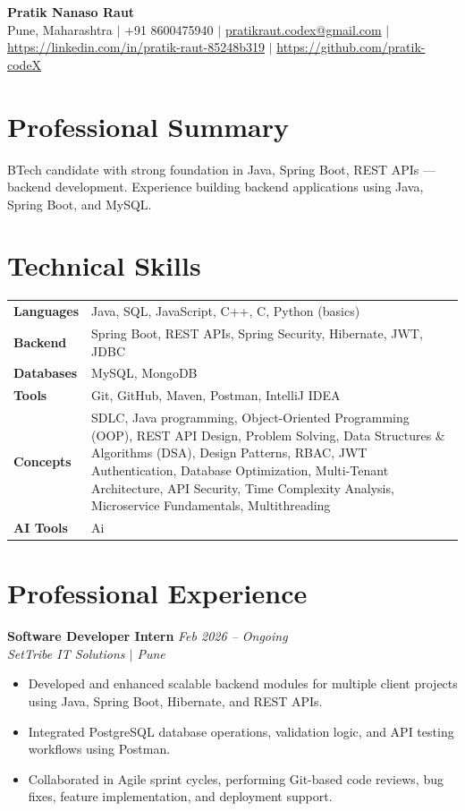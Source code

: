 \documentclass[10.5pt,a4paper]{article}
\begin{document}
\begin{center}
{\Large\bfseries Pratik Nanaso Raut}\\[2pt]
Pune, Maharashtra $|$ +91 8600475940 $|$ \href{mailto:pratikraut.codex@gmail.com}{pratikraut.codex@gmail.com} $|$ \href{https://linkedin.com/in/pratik-raut-85248b319}{https://linkedin.com/in/pratik-raut-85248b319} $|$ \href{https://github.com/pratik-codeX}{https://github.com/pratik-codeX}
\end{center}
\vspace{-2pt}
\section{Professional Summary}
BTech candidate with strong foundation in Java, Spring Boot, REST APIs — backend development. Experience building backend applications using Java, Spring Boot, and MySQL.
\section{Technical Skills}
\begin{tabular}{@{}p{}p{}@{}}
\textbf{Languages} & Java, SQL, JavaScript, C++, C, Python (basics) \\[1pt]
\textbf{Backend} & Spring Boot, REST APIs, Spring Security, Hibernate, JWT, JDBC \\[1pt]
\textbf{Databases} & MySQL, MongoDB \\[1pt]
\textbf{Tools} & Git, GitHub, Maven, Postman, IntelliJ IDEA \\[1pt]
\textbf{Concepts} & SDLC, Java programming, Object-Oriented Programming (OOP), REST API Design, Problem Solving, Data Structures \& Algorithms (DSA), Design Patterns, RBAC, JWT Authentication, Database Optimization, Multi-Tenant Architecture, API Security, Time Complexity Analysis, Microservice Fundamentals, Multithreading \\[1pt]
\textbf{AI Tools} & Ai \\
\end{tabular}
\section{Professional Experience}
\textbf{Software Developer Intern} \hfill \textit{Feb 2026 -- Ongoing}
\\\textit{SetTribe IT Solutions $|$ Pune}
\begin{itemize}
  \item Developed and enhanced scalable backend modules for multiple client projects using Java, Spring Boot, Hibernate, and REST APIs.
  \item Integrated PostgreSQL database operations, validation logic, and API testing workflows using Postman.
  \item Collaborated in Agile sprint cycles, performing Git-based code reviews, bug fixes, feature implementation, and deployment support.
\end{itemize}
\end{document}
